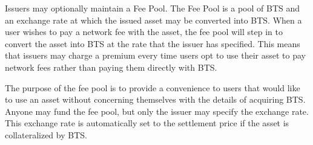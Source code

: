 Issuers may optionally maintain a Fee Pool. The Fee Pool is a pool of BTS and
an exchange rate at which the issued asset may be converted into BTS. When a
user wishes to pay a network fee with the asset, the fee pool will step in to
convert the asset into BTS at the rate that the issuer has specified. This
means that issuers may charge a premium every time users opt to use their asset
to pay network fees rather than paying them directly with BTS.

The purpose of the fee pool is to provide a convenience to users that would
like to use an asset without concerning themselves with the details of
acquiring BTS. Anyone may fund the fee pool, but only the issuer may specify
the exchange rate. This exchange rate is automatically set to the settlement
price if the asset is collateralized by BTS.
